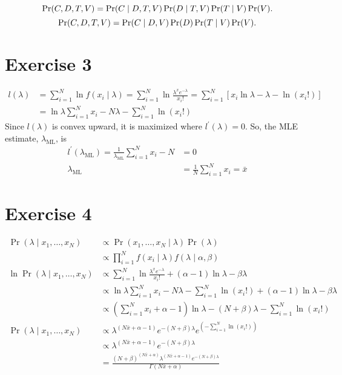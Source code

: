 \documentclass[letterpaper]{amsart}
\begin{document}
\begin{equation*}
  \Pr(C,D,T,V) = \Pr(C\mid D,T,V)\Pr(D\mid T,V)\Pr(T\mid V)\Pr(V). \\
\end{equation*}
\begin{equation*}
  \Pr(C,D,T,V) = \Pr(C\mid D,V)\Pr(D)\Pr(T\mid V)\Pr(V). \\
\end{equation*}

\section*{Exercise 3}
\begin{align*}
  l(\lambda)
  &= \sum_{i=1}^N\ln f(x_i \mid \lambda)
  = \sum_{i=1}^N\ln \frac{\lambda^x e^{-\lambda}}{x_i!}
  = \sum_{i=1}^N \left[x_i\ln\lambda-\lambda-\ln(x_i!) \right]
    \\
  &= \ln\lambda\sum_{i=1}^N x_i -N\lambda-\sum_{i=1}^N\ln(x_i!)
\end{align*}
Since
$l(\lambda)$
is convex upward, it is maximized where
$l^\prime(\lambda) = 0$.
So,  the MLE estimate,
\(\lambda_{\text{ML}}\),
is
\begin{align*}
    l^\prime(\lambda_{\text{ML}})
  =
  \frac{1}
  {\lambda_{\text{ML}}}
    \sum_{i=1}^N x_i
    -N
  &= 0
  \\
  \lambda_{\text{ML}}
  &=
    \frac{1}{N}
    \sum_{i=1}^N x_i
    = \bar{x}
\end{align*}
\section*{Exercise 4}
\begin{align*}
  \Pr(\lambda\mid x_1,\dots, x_N)
  &\propto
    \Pr(x_1,\dots, x_N\mid\lambda)\Pr(\lambda)
    \\
  &\propto
    \prod_{i=1}^Nf(x_i\mid\lambda)f(\lambda\mid\alpha,\beta)
    \\
  \ln\Pr(\lambda\mid x_1,\dots, x_N)
  &\propto
   \sum_{i=1}^N\ln \frac{\lambda^x e^{-\lambda}}{x_i!}
    + (\alpha - 1)\ln\lambda-\beta\lambda
    \\
  &\propto
    \ln\lambda\sum_{i=1}^N x_i -N\lambda
    -\sum_{i=1}^N\ln(x_i!)
    + (\alpha - 1)\ln\lambda-\beta\lambda
    \\
  &\propto
    \left(
    \sum_{i=1}^N x_i+\alpha-1
    \right)
    \ln\lambda
    -(N + \beta)\lambda
    -\sum_{i=1}^N\ln(x_i!)
    \\
  \Pr(\lambda\mid x_1,\dots, x_N)
  &\propto
    \lambda^{
    \left(
    N\bar{x}+\alpha-1
    \right)
    }
    e^{
    -(N + \beta)\lambda
    }
    e^{
    \left(
    -\sum_{i=1}^N\ln(x_i!)
      \right)
    }
    \\
  &\propto
    \lambda^{
    \left(
    N\bar{x}+\alpha-1
    \right)
    }
    e^{
    -(N + \beta)\lambda
    }
  \\
  &=
    \frac{
    (N+\beta)^{(N\bar{x}+\alpha)}
    \lambda^{(N\bar{x}+\alpha-1)}
    e^{-(N + \beta)\lambda}
    }
    {
    \Gamma\left(
    N\bar{x}+\alpha
    \right)
    }
\end{align*}
\end{document}
